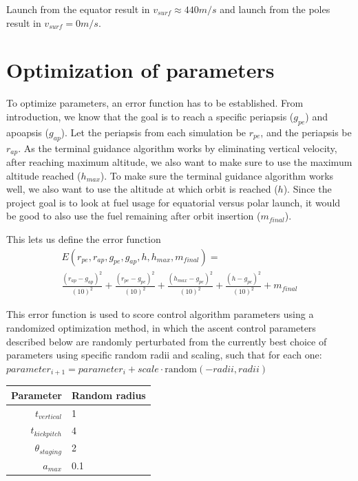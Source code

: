\documentclass[11pt]{article}
\begin{document}
Launch from the equator result in $v_{surf} \approx 440 m/s$ and launch from the poles result in $v_{surf} = 0 m/s$.

\section{Optimization of parameters}
To optimize parameters, an error function has to be established.
From introduction, we know that the goal is to reach a specific periapsis ($g_{pe}$) and apoapsis ($g_{ap}$). 
Let the periapsis from each simulation be $r_{pe}$, and the periapsis be $r_{ap}$.
As the terminal guidance algorithm works by eliminating vertical velocity, after reaching maximum altitude, we also want to make sure to use the maximum altitude reached ($h_{max}$).
To make sure the terminal guidance algorithm works well, we also want to use the altitude at which orbit is reached ($h$).
Since the project goal is to look at fuel usage for equatorial versus polar launch, it would be good to also use the fuel remaining after orbit insertion ($m_{final}$).

This lets us define the error function
$$
\begin{aligned}
E(r_{pe}, r_{ap}, g_{pe}, g_{ap}, h, h_{max}, m_{final}) = \\
\frac{{\left( r_{ap} - g_{ap} \right)}^2}{{\left( 10 \right)}^2} +
\frac{{\left( r_{pe} - g_{pe} \right)}^2}{{\left( 10 \right)}^2} +
\frac{{\left( h_{max} - g_{pe} \right)}^2}{{\left( 10 \right)}^2} +
\frac{{\left( h - g_{pe} \right)}^2}{{\left( 10 \right)}^2}
+ m_{final}
\end{aligned}
$$

This error function is used to score control algorithm parameters using a randomized optimization method, in which the ascent control parameters described below 
are randomly perturbated from the currently best choice of parameters using specific random radii and scaling, such that for each one: $parameter_{i+1} = parameter_{i} + scale \cdot \text{random}(-radii, radii)$
\begin{center}
  \begin{tabular}{ r | l  }
    Parameter & Random radius \\
    \hline
    $t_{vertical}$ & 1 \\
    $t_{kickpitch}$ & 4 \\
    $\theta_{staging}$ & 2 \\
    $a_{max}$ & 0.1 \\
  \end{tabular}
\end{center}
\end{document}
